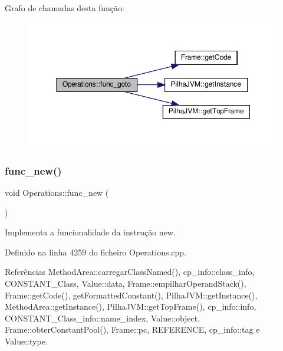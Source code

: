 Grafo de chamadas desta função\+:
\nopagebreak
\begin{figure}[H]
\begin{center}
\leavevmode
\includegraphics[width=350pt]{classOperations_aa4ae9d3899f61ee20ec278152891fe9e_cgraph}
\end{center}
\end{figure}
\mbox{\label{classOperations_a7594e147407e1f4ede57229899fd17d6}} 
\subsubsection{\texorpdfstring{func\+\_\+new()}{func\_new()}}
{\footnotesize\ttfamily void Operations\+::func\+\_\+new (\begin{DoxyParamCaption}{ }\end{DoxyParamCaption})\hspace{0.3cm}{\ttfamily [private]}}



Implementa a funcionalidade da instrução new. 



Definido na linha 4259 do ficheiro Operations.\+cpp.



Referências Method\+Area\+::carregar\+Class\+Named(), cp\+\_\+info\+::class\+\_\+info, C\+O\+N\+S\+T\+A\+N\+T\+\_\+\+Class, Value\+::data, Frame\+::empilhar\+Operand\+Stack(), Frame\+::get\+Code(), get\+Formatted\+Constant(), Pilha\+J\+V\+M\+::get\+Instance(), Method\+Area\+::get\+Instance(), Pilha\+J\+V\+M\+::get\+Top\+Frame(), cp\+\_\+info\+::info, C\+O\+N\+S\+T\+A\+N\+T\+\_\+\+Class\+\_\+info\+::name\+\_\+index, Value\+::object, Frame\+::obter\+Constant\+Pool(), Frame\+::pc, R\+E\+F\+E\+R\+E\+N\+CE, cp\+\_\+info\+::tag e Value\+::type.



